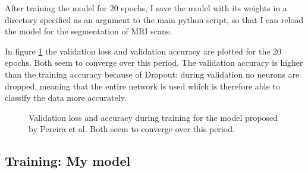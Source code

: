 \documentclass[12pt,a4paper,twoside,openright]{report}
\newlength\figureheight
\newlength\figurewidth
\begin{document}
After training the model for 20 epochs, I save the model with its weights in a directory specified as an argument to the main python script, so that I can reload the model for the segmentation of MRI scans. 

In figure \ref{fig:pereira_validation_loss} the validation loss and validation accuracy are plotted for the 20 epochs. Both seem to converge over this period. The validation accuracy is higher than the training accuracy because of Dropout: during validation no neurons are dropped, meaning that the entire network is used which is therefore able to classify the data more accurately.

\begin{figure}
	\centering
	\setlength\figureheight{10cm}
	\setlength{}
	
	\caption[Validation loss and accuracy during training for the model proposed by Pereira et al.]{Validation loss and accuracy during training for the model proposed by Pereira et al. Both seem to converge over this period.}
	\label{fig:pereira_validation_loss}
\end{figure}

\subsection{Training: My model}
\end{document}
